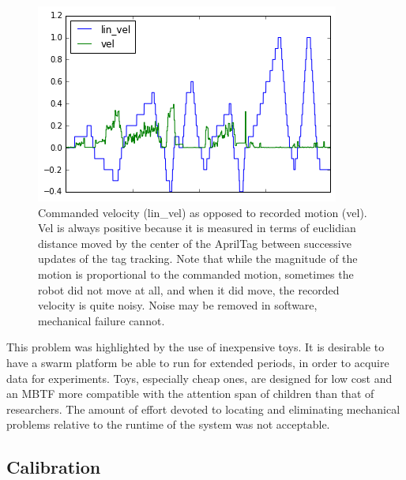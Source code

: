 \begin{figure}[t]
	\includegraphics{motion_vs_cmd}
	\centering
	\caption{Commanded velocity (lin\_vel) as opposed to recorded motion (vel). Vel is always positive because it is measured in terms of euclidian distance moved by the center of the AprilTag between successive updates of the tag tracking. 
		Note that while the magnitude of the motion is proportional to the commanded motion, sometimes the robot did not move at all, and when it did move, the recorded velocity is quite noisy. Noise may be removed in software, mechanical failure cannot.} 
	\label{motor-speed-fig}
\end{figure}

This problem was highlighted by the use of inexpensive toys. 
It is desirable to have a swarm platform be able to run for extended periods, in order to acquire data for experiments. 
Toys, especially cheap ones, are designed for low cost and an MBTF more compatible with the attention span of children than that of researchers. 
The amount of effort devoted to locating and eliminating mechanical problems relative to the runtime of the system was not acceptable.

\subsection{Calibration} \label{section:Calibration}

